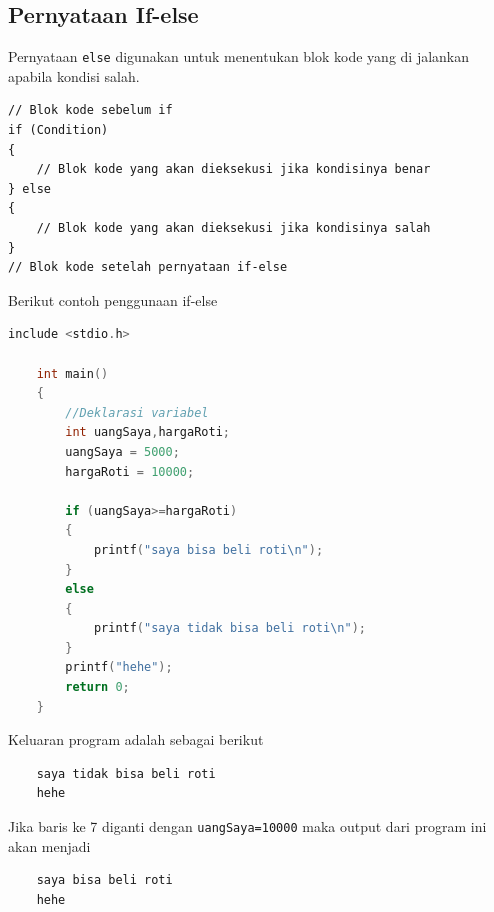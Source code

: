 \subsection{Pernyataan If-else}
Pernyataan \verb|else| digunakan untuk menentukan blok kode yang di jalankan apabila kondisi salah.
\begin{verbatim}
// Blok kode sebelum if
if (Condition) 
{
	// Blok kode yang akan dieksekusi jika kondisinya benar
} else
{
	// Blok kode yang akan dieksekusi jika kondisinya salah
}
// Blok kode setelah pernyataan if-else
\end{verbatim}
Berikut contoh penggunaan if-else
\begin{lstlisting}[language=c,caption = if-else example,label=lst:ifelseexample01]
	include <stdio.h>
	
	int main()
	{
		//Deklarasi variabel 
		int uangSaya,hargaRoti;
		uangSaya = 5000;
		hargaRoti = 10000;
		
		if (uangSaya>=hargaRoti)
		{
		    printf("saya bisa beli roti\n");
		}
		else
		{
	        printf("saya tidak bisa beli roti\n");	
		}
		printf("hehe");
		return 0;
	}
\end{lstlisting}
Keluaran program adalah sebagai berikut
\begin{verbatim}
    saya tidak bisa beli roti
    hehe
\end{verbatim}
Jika baris ke 7 diganti dengan \verb|uangSaya=10000| maka output dari program ini akan menjadi
\begin{verbatim}
    saya bisa beli roti
    hehe
\end{verbatim}

